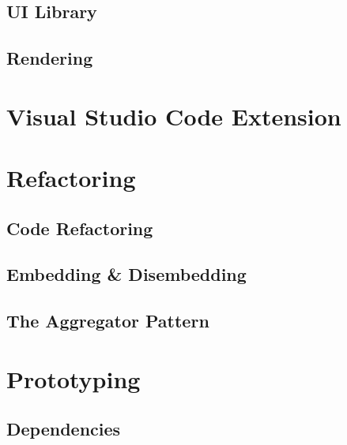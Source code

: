 \subsection{UI Library}
\subsection{Rendering}

\section{Visual Studio Code Extension}

\section{Refactoring}
\subsection{Code Refactoring}
\subsection{Embedding \& Disembedding}
\subsection{The Aggregator Pattern}

\section{Prototyping}
\subsection{Dependencies}
\clearpage